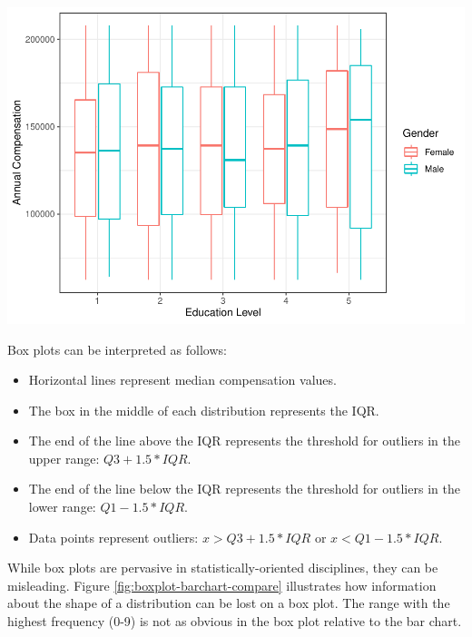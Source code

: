 \documentclass[
]{book}
\providecommand{\tightlist}{%
  \setlength{\itemsep}{0pt}\setlength{\parskip}{0pt}}
\begin{document}
\includegraphics{The_Fundamentals_of_People_Analytics_files/figure-latex/unnamed-chunk-107-1.pdf}

Box plots can be interpreted as follows:

\begin{itemize}
\tightlist
\item
  Horizontal lines represent median compensation values.
\item
  The box in the middle of each distribution represents the IQR.
\item
  The end of the line above the IQR represents the threshold for outliers in the upper range: \(Q3 + 1.5 * IQR\).
\item
  The end of the line below the IQR represents the threshold for outliers in the lower range: \(Q1 - 1.5 * IQR\).
\item
  Data points represent outliers: \(x > Q3 + 1.5 * IQR\) or \(x < Q1 - 1.5 * IQR\).
\end{itemize}

While box plots are pervasive in statistically-oriented disciplines, they can be misleading. Figure \ref{fig:boxplot-barchart-compare} illustrates how information about the shape of a distribution can be lost on a box plot. The range with the highest frequency (0-9) is not as obvious in the box plot relative to the bar chart.
\end{document}
